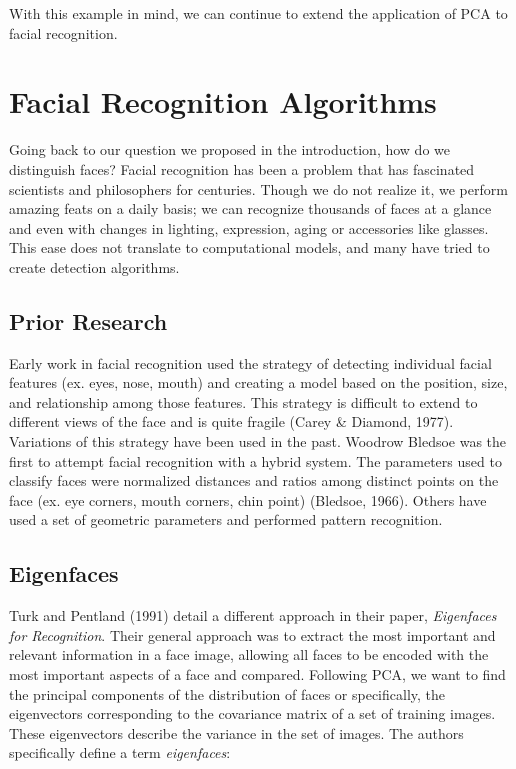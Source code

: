 \documentclass{article}
\begin{document}
\noindent With this example in mind, we can continue to extend the application of PCA to facial recognition.

\pagebreak

\section{Facial Recognition Algorithms}
Going back to our question we proposed in the introduction, how do we distinguish faces? Facial recognition has been a problem that has fascinated scientists and philosophers for centuries. Though we do not realize it, we perform amazing feats on a daily basis; we can recognize thousands of faces at a glance and even with changes in lighting, expression, aging or accessories like glasses. This ease does not translate to computational models, and many have tried to create detection algorithms.


\subsection{Prior Research}
Early work in facial recognition used the strategy of detecting individual facial features (ex. eyes, nose, mouth) and creating a model based on the position, size, and relationship among those features. This strategy is difficult to extend to different views of the face and is quite fragile (Carey \& Diamond, 1977).
Variations of this strategy have been used in the past. Woodrow Bledsoe was the first to attempt facial recognition with a hybrid system. The parameters used to classify faces were normalized distances and ratios among distinct points on the face (ex. eye corners, mouth corners, chin point) (Bledsoe, 1966). Others have used a set of geometric parameters and performed pattern recognition. 

\subsection{Eigenfaces}
Turk and Pentland (1991) detail a different approach in their paper, \textit{Eigenfaces for Recognition}. Their general approach was to extract the most important and relevant information in a face image, allowing all faces to be encoded with the most important aspects of a face and compared. Following PCA, we want to find the principal components of the distribution of faces or specifically, the eigenvectors corresponding to the covariance matrix of a set of training images. These eigenvectors describe the variance in the set of images. The authors specifically define a term \textit{eigenfaces}:
\end{document}
